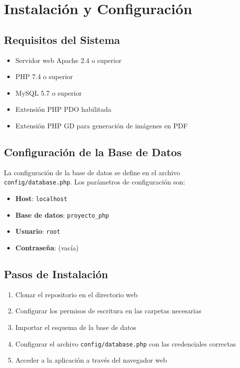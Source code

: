\documentclass{article}
\begin{document}
\section{Instalación y Configuración}
\subsection{Requisitos del Sistema}
\begin{itemize}
    \item Servidor web Apache 2.4 o superior
    \item PHP 7.4 o superior
    \item MySQL 5.7 o superior
    \item Extensión PHP PDO habilitada
    \item Extensión PHP GD para generación de imágenes en PDF
\end{itemize}

\subsection{Configuración de la Base de Datos}
La configuración de la base de datos se define en el archivo \texttt{config/database.php}. Los parámetros de configuración son:

\begin{itemize}
    \item \textbf{Host}: \texttt{localhost}
    \item \textbf{Base de datos}: \texttt{proyecto\_php}
    \item \textbf{Usuario}: \texttt{root}
    \item \textbf{Contraseña}: (vacía)
\end{itemize}

\subsection{Pasos de Instalación}
\begin{enumerate}
    \item Clonar el repositorio en el directorio web
    \item Configurar los permisos de escritura en las carpetas necesarias
    \item Importar el esquema de la base de datos
    \item Configurar el archivo \texttt{config/database.php} con las credenciales correctas
    \item Acceder a la aplicación a través del navegador web
\end{enumerate}
\end{document}
